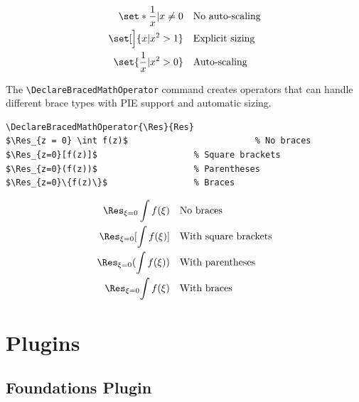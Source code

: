 \documentclass{article}
\begin{document}
\begin{align*}
  \set*{\frac{1}{x} | x \neq 0} &\quad\text{No auto-scaling} \\
  \set[\Big]{x | x^2 > 1} 		&\quad\text{Explicit sizing} \\
  \set{\frac{1}{x} | x^2 > 0} 	&\quad\text{Auto-scaling} 
\end{align*}



The \verb|\DeclareBracedMathOperator| command creates operators that can handle different brace types with PIE support and automatic sizing.

\begin{verbatim}
\DeclareBracedMathOperator{\Res}{Res}
$\Res_{z = 0} \int f(z)$                         % No braces
$\Res_{z=0}[f(z)]$                   % Square brackets
$\Res_{z=0}(f(z))$                   % Parentheses
$\Res_{z=0}\{f(z)\}$                 % Braces
\end{verbatim}

\begin{align*}
  \Res_{\xi = 0} \int f(\xi) &\quad\text{No braces} \\
  \Res_{\xi=0}[\int f(\xi)] &\quad\text{With square brackets} \\
  \Res_{\xi=0}(\int f(\xi)) &\quad\text{With parentheses} \\
  \Res_{\xi=0}{\int f(\xi)} &\quad\text{With braces}
\end{align*}

\section{Plugins}

\subsection{Foundations Plugin}
\end{document}
